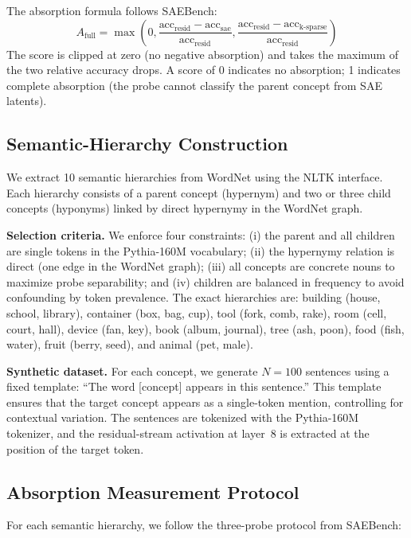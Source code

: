 \documentclass{article}
\begin{document}
The absorption formula follows SAEBench:
\begin{equation}
A_{\text{full}} = \max\left(0, \frac{\text{acc}_{\text{resid}} - \text{acc}_{\text{sae}}}{\text{acc}_{\text{resid}}}, \frac{\text{acc}_{\text{resid}} - \text{acc}_{\text{k-sparse}}}{\text{acc}_{\text{resid}}}\right)
\end{equation}
The score is clipped at zero (no negative absorption) and takes the maximum of the two relative accuracy drops. A score of 0 indicates no absorption; 1 indicates complete absorption (the probe cannot classify the parent concept from SAE latents).

\subsection{Semantic-Hierarchy Construction}

We extract 10 semantic hierarchies from WordNet \citep{miller1995wordnet} using the NLTK interface. Each hierarchy consists of a parent concept (hypernym) and two or three child concepts (hyponyms) linked by direct hypernymy in the WordNet graph.

\textbf{Selection criteria.} We enforce four constraints: (i) the parent and all children are single tokens in the Pythia-160M vocabulary; (ii) the hypernymy relation is direct (one edge in the WordNet graph); (iii) all concepts are concrete nouns to maximize probe separability; and (iv) children are balanced in frequency to avoid confounding by token prevalence. The exact hierarchies are: building (house, school, library), container (box, bag, cup), tool (fork, comb, rake), room (cell, court, hall), device (fan, key), book (album, journal), tree (ash, poon), food (fish, water), fruit (berry, seed), and animal (pet, male).

\textbf{Synthetic dataset.} For each concept, we generate $N = 100$ sentences using a fixed template: ``The word [concept] appears in this sentence.'' This template ensures that the target concept appears as a single-token mention, controlling for contextual variation. The sentences are tokenized with the Pythia-160M tokenizer, and the residual-stream activation at layer~8 is extracted at the position of the target token.

\subsection{Absorption Measurement Protocol}

For each semantic hierarchy, we follow the three-probe protocol from SAEBench:
\end{document}
